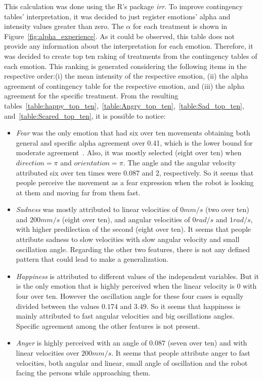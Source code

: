 This calculation was done using the R's package \textit{irr}. To improve contingency tables' interpretation, it was decided to just register emotions' alpha and intensity values greater than zero. The $\alpha$ for each treatment is shown in Figure~\ref{fig:alpha_experience}. As it could be observed, this table does not provide any information about the interpretation for each emotion. Therefore, it was decided to create top ten raking of treatments from the contingency tables of each emotion. This ranking is generated considering the following items in the respective order:(i) the mean intensity of the respective emotion, (ii) the alpha agreement of contingency table for the respective emotion, and (iii) the alpha agreement for the specific treatment. From the resulting tables~\ref{table:happy_top_ten},~\ref{table:Angry_top_ten},~\ref{table:Sad_top_ten}, and~\ref{table:Scared_top_ten}, it is possible to notice:

\begin{itemize}

	\item \textit{Fear} was the only emotion that had six over ten movements obtaining both general and specific alpha agreement over 0.41, which is the lower bound for moderate agreement~\cite{Viera2005}. Also, it was mostly selected (eight over ten) when $direction = \pi$ and $orientation = \pi$. The angle and the angular velocity attributed six over ten times were $0.087$ and $2$, respectively. So it seems that people perceive the movement as a fear expression when the robot is looking at them and moving far from them fast. 
	
	\item \textit{Sadness} was mostly attributed to linear velocities of $0 mm/s$ (two over ten) and $200 mm/s$ (eight over ten), and angular velocities of $0 rad/s$ and $1 rad/s$, with higher predilection of the second (eight over ten). It seems that people attribute sadness to slow velocities with slow angular velocity and small oscillation angle. Regarding the other two features, there is not any defined pattern that could lead to make a generalization. 

	\item \textit{Happiness} is attributed to different values of the independent variables. But it is the only emotion that is highly perceived when the linear velocity is $0$ with four over ten. However the oscillation angle for these four cases is equally divided between the values $0.174$ and $3.49$. %
So it seems that happiness is mainly attributed to fast angular velocities and big oscillations angles. Specific agreement among the other features is not present.

	\item \textit{Anger} is highly perceived with an angle of $0.087$ (seven over ten) and with linear velocities over $200 mm/s$. It seems that people attribute anger to fast velocities, both angular and linear, small angle of oscillation and the robot facing the persons while approaching them. 
\end{itemize} 

